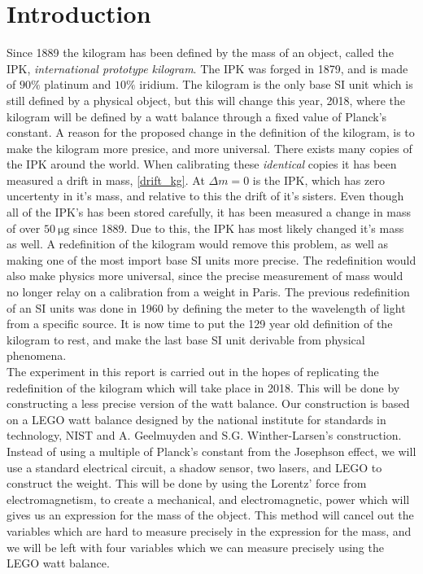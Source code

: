 \documentclass[english,a4paper,12pt,reprint]{revtex4-1}
\begin{document}
\section{Introduction}
Since 1889 the kilogram has been defined by the mass of an object, called the IPK, \textit{international prototype kilogram}. The IPK was forged in 1879, and is made of $90\%$ platinum and $10\%$ iridium. The kilogram is the only base SI unit which is still defined by a physical object, but this will change this year, 2018, where the kilogram will be defined by a watt balance through a fixed value of Planck's constant. A reason for the proposed change in the definition of the kilogram, is to make the kilogram more presice, and more universal. There exists many copies of the IPK around the world. When calibrating these \textit{identical} copies it has been measured a drift in mass, \vref{drift_kg}. At $\Delta m = 0$ is the IPK, which has zero uncertenty in it's mass, and relative to this the drift of it's sisters. Even though all of the IPK's has been stored carefully, it has been measured a change in mass of over $\SI{50}{\micro\gram}$ since 1889. Due to this, the IPK has most likely changed it's mass as well. A redefinition of the kilogram would remove this problem, as well as making one of the most import base SI units more precise. The redefinition would also make physics more universal, since the precise measurement of mass would no longer relay on a calibration from a weight in Paris. The previous redefinition of an SI units was done in 1960 by defining the meter to the wavelength of light from a specific source. It is now time to put the 129 year old definition of the kilogram to rest, and make the last base SI unit derivable from physical phenomena.\\
The experiment in this report is carried out in the hopes of replicating the redefinition of the kilogram which will take place in 2018. This will be done by constructing a less precise version of the watt balance. Our construction is based on a LEGO watt balance designed by the national institute for standards in technology, NIST \cite{chao_lego_2015} and A. Geelmuyden and S.G. Winther-Larsen's \cite{August} construction. Instead of using a multiple of Planck's constant from the Josephson effect, we will use a standard electrical circuit, a shadow sensor, two lasers, and LEGO to construct the weight. This will be done by using the Lorentz' force from electromagnetism, to create a mechanical, and electromagnetic, power which will gives us an expression for the mass of the object. This method will cancel out the variables which are hard to measure precisely in the expression for the mass, and we will be left with four variables which we can measure precisely using the LEGO watt balance.
\end{document}
